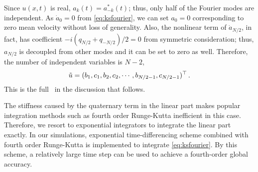 Since $u(x,t)$ is real, $a_{k}(t)=a^{*}_{-k}(t)$; thus, only half of the
Fourier modes are independent. As $\dot{a}_{0}=0$ from
\eqref{eq:ksfourier}, we can set $a_{0}=0$ corresponding to
zero mean velocity without loss of generality.
Also, the nonlinear term
of $\dot{a}_{N/2}$, in fact, has coefficient
$-i(q_{N/2} + q_{-N/2})/2 = 0$
from symmetric consideration;
thus, $a_{N/2}$ is decoupled from other modes and it
can be set to zero as well. Therefore, the number of independent variables
is $N-2$,
\begin{equation}
  \label{eq:fourierspace}
  \tilde{u}=(b_{1},c_{1},b_{2},c_{2},\cdots,b_{N/2-1},c_{N/2-1})^\top
  \,.
\end{equation}
This is the full \statesp\ in the discussion that follows. 

The stiffness caused by the quaternary term in the linear part
 makes popular integration methods such as
fourth order Runge-Kutta inefficient in this case. Therefore,
we resort to exponential integrators to
integrate the linear part exactly. In our simulations,
exponential time-differencing
scheme combined with fourth order Runge-Kutta
is implemented to integrate
\eqref{eq:ksfourier}. By this scheme, 
a relatively large time step can be used to 
achieve a fourth-order global accuracy. 

